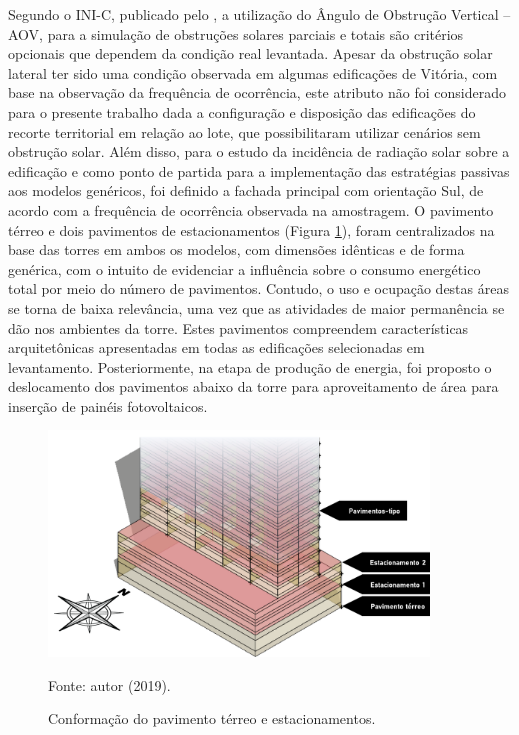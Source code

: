 \noindent Segundo o INI-C, publicado pelo \textcite{InstitutoNacionaldeMetrologiaNormalizacaoeQualidadeIndustrial-INMETRO2018},
a utilização do Ângulo de Obstrução Vertical – AOV, para a simulação de 
obstruções solares parciais e totais são critérios opcionais que dependem da condição real 
levantada. Apesar da obstrução solar lateral ter sido uma condição observada em algumas 
edificações de Vitória, com base na observação da frequência de ocorrência, este atributo não 
foi considerado para o presente trabalho dada a configuração e disposição das edificações do 
recorte territorial em relação ao lote, que possibilitaram utilizar cenários sem obstrução 
solar. Além disso, para o estudo da incidência de radiação solar sobre a edificação e como 
ponto de partida para a implementação das estratégias passivas aos modelos genéricos, foi 
definido a fachada principal com orientação Sul, de acordo com a frequência de ocorrência 
observada na amostragem.\vspace*{0.3cm} \newline
O pavimento térreo e dois pavimentos de estacionamentos (Figura \ref{fig:figura10}), foram centralizados na 
base das torres em ambos os modelos, com dimensões idênticas e de forma genérica, com o 
intuito de evidenciar a influência sobre o consumo energético total por meio do número de 
pavimentos. Contudo, o uso e ocupação destas áreas se torna de baixa relevância, uma vez que 
as atividades de maior permanência se dão nos ambientes da torre.\vspace*{0.3cm} \newline
Estes pavimentos compreendem características arquitetônicas apresentadas em todas as 
edificações selecionadas em levantamento. Posteriormente, na etapa de produção de energia, 
foi proposto o deslocamento dos pavimentos abaixo da torre para aproveitamento de área para 
inserção de painéis fotovoltaicos.
\begin{figure}[H]
    \centering
    \caption{\small Conformação do pavimento térreo e estacionamentos.}
    \includegraphics[width=0.9\textwidth]{figures/fig12-base_torre-1.png}
    \begin{flushleft}
        \par \small Fonte: autor (2019).
    \end{flushleft}
    \label{fig:figura10}
\end{figure}\vspace*{-0.5cm}
